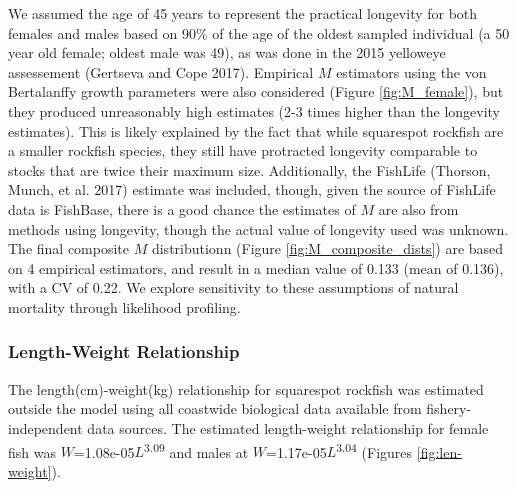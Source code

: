 \documentclass[11pt,
  english,
  a4paper,
]{article}
\begin{document}

We assumed the age of 45 years to represent the practical longevity for both females and males based on 90\% of the age of the oldest sampled individual (a 50 year old female; oldest male was 49), as was done in the 2015 yelloweye assessement {(Gertseva and Cope 2017)\leavevmode\tagmcend\tagstructend}. Empirical {\(M\)\leavevmode\tagmcend\tagstructend} estimators using the von Bertalanffy growth parameters were also considered (Figure \ref{fig:M_female}), but they produced unreasonably high estimates (2-3 times higher than the longevity estimates). This is likely explained by the fact that while squarespot rockfish are a smaller rockfish species, they still have protracted longevity comparable to stocks that are twice their maximum size. Additionally, the FishLife {(Thorson, Munch, et al. 2017)\leavevmode\tagmcend\tagstructend} estimate was included, though, given the source of FishLife data is FishBase, there is a good chance the estimates of {\(M\)\leavevmode\tagmcend\tagstructend} are also from methods using longevity, though the actual value of longevity used was unknown. The final composite {\(M\)\leavevmode\tagmcend\tagstructend} distributionn (Figure \ref{fig:M_composite_dists}) are based on 4 empirical estimators, and result in a median value of 0.133 (mean of 0.136), with a CV of 0.22. We explore sensitivity to these assumptions of natural mortality through likelihood profiling.

\leavevmode\tagmcend\tagstructend\par


\hypertarget{length-weight-relationship}{%
\subsubsection{Length-Weight Relationship}\label{length-weight-relationship}}

\leavevmode\tagmcend\tagstructend


The length(cm)-weight(kg) relationship for squarespot rockfish was estimated outside the model using all coastwide biological data available from fishery-independent data sources. The estimated length-weight relationship for female fish was {\(W\)\leavevmode\tagmcend\tagstructend}=1.08e-05{\(L\)\leavevmode\tagmcend\tagstructend}\textsuperscript{3.09} and males at {\(W\)\leavevmode\tagmcend\tagstructend}=1.17e-05{\(L\)\leavevmode\tagmcend\tagstructend}\textsuperscript{3.04} (Figures \ref{fig:len-weight}).
\end{document}
